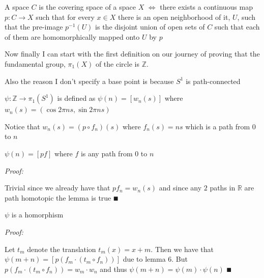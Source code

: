 \documentclass[paper=a4,fontsize=paper,12.5pt]{book}
\newcommand{\3}{\vspace*{3mm}}
\newcommand{\Proof}{\textit{Proof:}}
\newcommand{\IFF}{$\Longleftrightarrow$ \hspace*{.5mm}}
\newcommand{\fund}[1]{{\pi}_{1}(#1)}
\newcommand{\A}{\fund{\C{1}}}
\newcommand{\Z}{\mathbb{Z}}
\newcommand{\R}{\mathbb{R}}
\newcommand{\C}[1]{{S}^{#1}}
\begin{document}
\3

\begin{definition}

A space $C$ is the covering space of a space $X$ \IFF there exists a continuous map $p:C \to X$ such that for every $x \in X$ there is an open neighborhood of it, $U$, such that the pre-image ${p}^{-1}(U)$ is the disjoint union of open sets of $C$ such that each of them are homomorphically mapped onto $U$ by $p$


\end{definition}

\3

Now finally I can start with the first definition on our journey of proving that the fundamental group, ${\pi}_{1}(X)$ of the circle is $\Z$. 

\3

Also the reason I don't specify a base point is because $\C{1}$ is path-connected

\3

\begin{definition}

$\psi: \Z \to \A$ is defined as $\psi(n) = [{w}_{n}(s)]$ where ${w}_{n}(s) = (\cos 2\pi ns, \sin 2\pi ns)$

\3

Notice that ${w}_{n}(s) = (p \circ {f}_{n})(s)$ where ${f}_{n}(s) = ns$ which is a path from $0$ to $n$

\end{definition}

\3

\begin{lemma}

$\psi(n) = [pf]$ where $f$ is any path from $0$ to $n$


\end{lemma}

\Proof

Trivial since we already have that $p{f}_{n} = {w}_{n}(s)$ and since any $2$ paths in $\R$ are path homotopic the lemma is true $\QED$

\3

\begin{lemma}

$\psi$ is a homorphism


\end{lemma} 


\Proof

Let ${t}_{m}$ denote the translation ${t}_{m}(x) = x + m$. Then we have that $\psi(m+n) = [p({f}_{m} \cdot ( {t}_{m} \circ {f}_{n}))]$ due to lemma $6$. But $p({f}_{m} \cdot ( {t}_{m} \circ {f}_{n})) = {w}_{m} \cdot {w}_{n}$ and thus $\psi(m+n) = \psi(m) \cdot \psi(n)$ $\QED$
\end{document}
